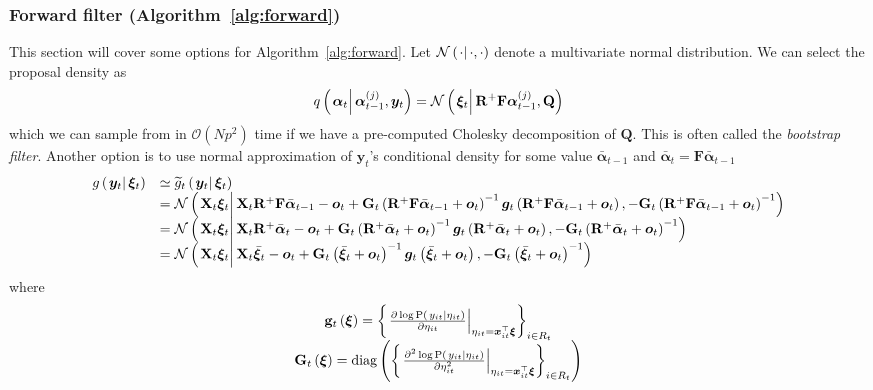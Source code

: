 \documentclass[notitlepage]{article}
\renewcommand{\vec}[1]{\bm{#1}}
\newcommand{\vecb}[1]{\bar{\vec{#1}}}
\newcommand{\mat}[1]{\mathbf{#1}}
\newcommand{\Lbrace}[1]{\left\{ #1\right\}}
\newcommand{\Lparen}[1]{\left( #1\right)}
\newcommand{\Cond}[2]{\left. #1 \vphantom{#2} \right\vert  #2}
\newcommand{\Prob}{\text{P}}
\newcommand{\optor}[2]{#1\Lparen{#2}}
\newcommand{\optorC}[3]{\optor{#1}{\Cond{#2}{#3}}}
\newcommand{\propC}[2]{\optorC{\Prob}{#1}{#2}}
\newcommand{\normalC}[3]{\optorC{\mathcal{N}}{#1}{#2,#3}}
\newcommand{\IDC}[2]{\optorC{q}{#1}{#2}}
\newcommand{\diag}[1]{\optor{\text{diag}}{#1}}
\newcommand{\partic}[3]{#1_{#2}^{\Lparen{#3}}}
\newcommand{\bigO}[1]{\mathcal{O}\Lparen{#1}}
\newcommand{\dimState}{p}
\newcommand{\nPart}{N}
\begin{document}
\subsubsection*{Forward filter (Algorithm~\ref{alg:forward})}
This section will cover some options for Algorithm~\ref{alg:forward}. Let $\normalC{\cdot}{\cdot}{\cdot}$ denote a multivariate normal distribution. We can select the proposal density as%
%
\begin{equation}
	\IDC{\vec{\alpha}_t}{\partic{\vec{\alpha}}{t-1}{j}, \vec{y}_t} = %
		\normalC{\vec{\xi}_t}{\mat{R}^{+}\mat{F}\partic{\vec{\alpha}}{t-1}{j}}{\mat{Q}}
\end{equation}%
%
which we can sample from in $\bigO{\nPart \dimState^2}$ time if we have a pre-computed Cholesky decomposition of $\mat{Q}$. This is often called the \emph{bootstrap filter}. Another option is to use normal approximation of $\vec{y}_t$'s conditional density for some value $\vecb{\alpha}_{t - 1}$ and $\vecb{\alpha}_t = \mat{F}\vecb{\alpha}_{t - 1}$ %
%
{\scriptsize %
\begin{equation}\begin{array}{cl}
	\optorC{g}{\vec{y}_t}{\vec{\xi}_t} & \simeq  \optorC{\widetilde{g}_t}{\vec{y}_t}{\vec{\xi}_t} \\ 
%
&= \normalC{
		\mat{X}_t\vec{\xi}_t
	}{ %
		\mat{X}_t\mat{R}^{+}\mat{F}\vecb{\alpha}_{t - 1} - \vec{o}_t + 
		\mat{G}_t\Lparen{\mat{R}^{+}\mat{F}\vecb{\alpha}_{t - 1} + \vec{o}_t}^{-1}
		\vec{g}_t\Lparen{\mat{R}^{+}\mat{F}\vecb{\alpha}_{t - 1} + \vec{o}_t}
	}{ %
		- \mat{G}_t\Lparen{\mat{R}^{+}\mat{F}\vecb{\alpha}_{t - 1} + \vec{o}_t}^{-1}
	} \\
%
&= \normalC{
		\mat{X}_t\vec{\xi}_t
	}{ %
		\mat{X}_t\mat{R}^{+}\vecb{\alpha}_{t} - \vec{o}_t + 
		\mat{G}_t\Lparen{\mat{R}^{+}\vecb{\alpha}_{t} + \vec{o}_t}^{-1}
		\vec{g}_t\Lparen{\mat{R}^{+}\vecb{\alpha}_{t} + \vec{o}_t}
	}{ %
		- \mat{G}_t\Lparen{\mat{R}^{+}\vecb{\alpha}_{t} + \vec{o}_t}^{-1}
	} \\
%
&= \normalC{
		\mat{X}_t\vec{\xi}_t
	}{ %
		\mat{X}_t\vecb{\xi}_{t} - \vec{o}_t + 
		\mat{G}_t\Lparen{\vecb{\xi}_{t} + \vec{o}_t}^{-1}
		\vec{g}_t\Lparen{\vecb{\xi}_{t} + \vec{o}_t}
	}{ %
		- \mat{G}_t\Lparen{\vecb{\xi}_{t} + \vec{o}_t}^{-1}
	} \\ 
\end{array}\end{equation}%
}%
%
where%
%
\begin{equation}\begin{array}{c}
\mat{g}_t\Lparen{\vec{\xi}} =
		\Lbrace{\left.\frac{
		\partial \log \propC{y_{it}}{\eta_{it}}
	}{
		\partial\eta_{it}
	}\right|_{\eta_{it} = \vec{x}_{it}^\top\vec{\xi}} }_{i \in R_t} \\
%
	\mat{G}_t\Lparen{\vec{\xi}} =
		\diag{\Lbrace{\left.\frac{
		\partial^2 \log \propC{y_{it}}{\eta_{it}}
	}{
		\partial\eta_{it}^2
	}\right|_{\eta_{it} = \vec{x}_{it}^\top\vec{\xi}} }_{i \in R_t}}
\end{array}\end{equation}
\end{document}
